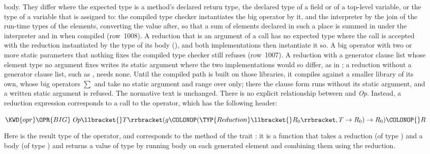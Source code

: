{body.
They differ where the expected type is a method's declared return type, the
declared type of a field or of a top-level variable, or the type of a variable
that is assigned to: the compiled type checker
instantiates the big operator by it, and the interpreter by the join of the
run-time types of the elements, converting the value after, so that a sum of
 elements declared  in such a place is
summed in  under the interpreter and in
 when compiled (row~1008).
A reduction that is an argument of a call has no expected type where the call
is accepted with the reduction instantiated by the type of its body
(), and both implementations then instantiate it
so.
A big operator with two or more static parameters that nothing fixes the
compiled type checker still refuses (row~1007).
A reduction with a generator clause list whose element type no argument fixes
writes its static argument where the two implementations would so differ, as
in ;
a reduction without a generator clause list, such as , needs none.
Until the compiled path is built on those libraries, it compiles against a
smaller library of its own, whose big operators $\sum$ and
 take no static argument and range over
 only; there the clause form runs without its static
argument, and a written static argument is refused.
The normative text is unchanged.}
There is no explicit relationship between  and
\emph{Op}.  Instead, a reduction expression corresponds to a call to the
 operator, which has the following header:
\begin{Fortress}
\(\KWD{opr} \mathord{\OPR{BIG}}\: \emph{Op}\llbracket{}T\rrbracket(g\COLONOP(\TYP{Reduction}\llbracket{}R_{0}\rrbracket,T\rightarrow{}R_{0})\rightarrow{}R_{0})\COLONOP{}R\)
\end{Fortress}
Here  is the result type of the operator, and  corresponds to
the method %
of the trait %
:
it is a function that takes a reduction (of type %
)
and a body (of type )
and returns a value of type  by running body on each
generated element and combining them using the reduction.
